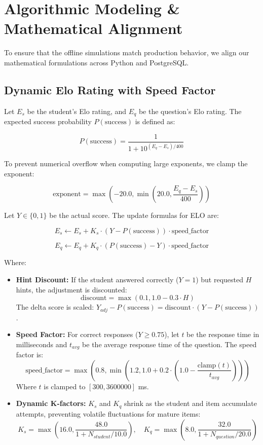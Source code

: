 \documentclass{article}
\begin{document}
\section{Algorithmic Modeling \& Mathematical Alignment}

To ensure that the offline simulations match production behavior, we align our mathematical formulations across Python and PostgreSQL.

\subsection{Dynamic Elo Rating with Speed Factor}
Let $E_s$ be the student's Elo rating, and $E_q$ be the question's Elo rating. The expected success probability $P(\text{success})$ is defined as:

\[P(\text{success}) = \frac{1}{1 + 10^{(E_q - E_s)/400}}\]

To prevent numerical overflow when computing large exponents, we clamp the exponent:

\[\text{exponent} = \max\left(-20.0, \min\left(20.0, \frac{E_q - E_s}{400}\right)\right)\]

Let $Y \in \{0, 1\}$ be the actual score. The update formulas for ELO are:

\[E_s \leftarrow E_s + K_s \cdot (Y - P(\text{success})) \cdot \text{speed\_factor}\]

\[E_q \leftarrow E_q + K_q \cdot (P(\text{success}) - Y) \cdot \text{speed\_factor}\]

Where:
\begin{itemize}
    \item \textbf{Hint Discount:} If the student answered correctly ($Y=1$) but requested $H$ hints, the adjustment is discounted:
  \[\text{discount} = \max(0.1, 1.0 - 0.3 \cdot H)\]
  The delta score is scaled: $Y_{adj} - P(\text{success}) = \text{discount} \cdot (Y - P(\text{success}))$.
    \item \textbf{Speed Factor:} For correct responses ($Y \ge 0.75$), let $t$ be the response time in milliseconds and $t_{avg}$ be the average response time of the question. The speed factor is:
  \[\text{speed\_factor} = \max\left(0.8, \min\left(1.2, 1.0 + 0.2 \cdot \left(1.0 - \frac{\text{clamp}(t)}{t_{avg}}\right)\right)\right)\]
  Where $t$ is clamped to $[300, 3600000]$ ms.
    \item \textbf{Dynamic K-factors:} $K_s$ and $K_q$ shrink as the student and item accumulate attempts, preventing volatile fluctuations for mature items:
  \[K_s = \max\left(16.0, \frac{48.0}{1 + N_{student}/10.0}\right), \quad K_q = \max\left(8.0, \frac{32.0}{1 + N_{question}/20.0}\right)\]
\end{itemize}
\end{document}
